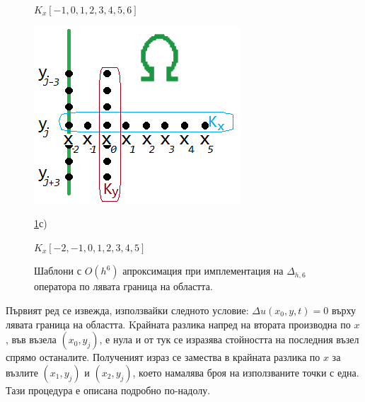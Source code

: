 \documentclass[a4paper]{article}
\theoremstyle{remark}
\begin{document}
\begin{large}
\begin{figure}
\begin{minipage}[b]{0.32\linewidth}
		\centerline{ $K_x[-1,0,1,2,3,4,5,6]$ }
	\end{minipage}
	\begin{minipage}[b]{0.32\linewidth}
		 \includegraphics[width=\linewidth]{LeftBoundaryE.png}
		\centerline{\ref{fig:LeftBoundary6}с)  }
		\centerline{$K_x[-2,-1,0,1,2,3,4,5]$ }
	\end{minipage}

	\caption{Шаблони с $O(h^6)$ апроксимация при имплементация на $\Delta_{h,6}$ оператора по лявата граница на областта.}
	\label{fig:LeftBoundary6}
\end{figure}

Първият ред се извежда, използвайки следното условие: $\Delta u(x_0, y, t) = 0$ върху лявата граница на областта. Kрайната разлика напред на втората производна по $x$, във възела $(x_0, y_j)$, е нула и от тук се изразява стойността на последния възел спрямо останалите. Полученият израз се замества в крайната разлика по $x$ за възлите $(x_1, y_j)$ и $(x_2, y_j)$, което намалява броя на използваните точки с една. Тази процедура е описана подробно по-надолу. 


\end{large}
\end{document}
